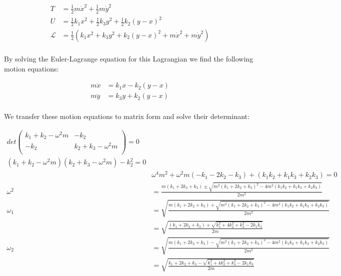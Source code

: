 \documentclass[10pt]{article} %
\begin{document}
\begin{align*}
  T &= \frac{1}{2}m\dot{x}^2 + \frac{1}{2}m\dot{y}^2\\
  U &= \frac{1}{2}k_1x^2 + \frac{1}{2}k_3y^2 + \frac{1}{2}k_2\left(y - x\right)^2\\
  \mathcal{L} &= \frac{1}{2}\left(k_1x^2 + k_3y^2 + k_2\left(y-x\right)^2 + m\dot{x}^2 + m\dot{y}^2\right)\\
\end{align*}

By solving the Euler-Lagrange equation for this Lagrangian we find the following motion equations:

\begin{align*}
  m\ddot{x} &= k_1x - k_2\left(y-x\right)\\
  m\ddot{y} &= k_3y + k_2\left(y-x\right)\\
\end{align*}

We transfer these motion equations to matrix form and solve their determinant:

\begin{align*}
  det
  \begin{pmatrix}
    k_1+k_2-\omega^2m & -k_2\\
    -k_2 & k_2 + k_3-\omega^2m\\
  \end{pmatrix}
  = 0\\
  \left(k_1+k_2-\omega^2m\right)\left(k_2 + k_3 - \omega^2m\right) - k_2^2 = 0\\
  &\omega^4m^2 + \omega^2m\left(-k_1-2k_2-k_3\right) + \left(k_1k_2 + k_1k_3 + k_2k_3\right) = 0\\
  \omega^2 &= \frac{m\left(k_1+2k_2+k_3\right) \pm \sqrt{m^2\left(k_1+2k_2+k_3\right)^2 - 4m^2\left(k_1k_2+k_1k_3+k_2k_3\right)}}{2m^2}\\
  \omega_1 &= \sqrt{\frac{m\left(k_1+2k_2+k_3\right) + \sqrt{m^2\left(k_1+2k_2+k_3\right)^2 - 4m^2\left(k_1k_2+k_1k_3+k_2k_3\right)}}{2m^2}}\\
  &= \sqrt{\frac{\left(k_1+2k_2+k_3\right) + \sqrt{k_1^2+4k_2^2+k_3^2-2k_1k_3}}{2m}}\\
  \omega_2 &= \sqrt{\frac{m\left(k_1+2k_2+k_3\right) - \sqrt{m^2\left(k_1+2k_2+k_3\right)^2 - 4m^2\left(k_1k_2+k_1k_3+k_2k_3\right)}}{2m^2}}\\
  &= \sqrt{\frac{k_1+2k_2+k_3 - \sqrt{k_1^2+4k_2^2+k_3^2-2k_1k_3}}{2m}}\\
\end{align*}
\end{document}
